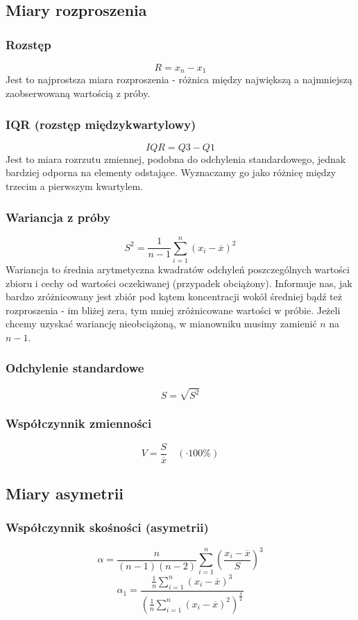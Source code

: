 \documentclass{article}
\theoremstyle{break}
\begin{document}
\subsection{Miary rozproszenia}
\subsubsection{Rozstęp}
$$R=x_n-x_1$$
Jest to najprostsza miara rozproszenia - różnica między największą a najmniejszą zaobserwowaną wartością z próby. 
\subsubsection{IQR (rozstęp międzykwartylowy)}
$$IQR=Q3-Q1$$
 Jest to miara rozrzutu zmiennej, podobna do odchylenia standardowego, jednak bardziej odporna na elementy odstające. Wyznaczamy go jako różnicę między trzecim a pierwszym kwartylem.
\subsubsection{Wariancja z próby}
$$S^2=\frac{1}{n-1}\sum\limits_{i=1}^{n}(x_i - \overline{x})^2$$
Wariancja to średnia arytmetyczna kwadratów odchyleń poszczególnych wartości zbioru i cechy od wartości oczekiwanej (przypadek obciążony).  Informuje nas, jak bardzo zróżnicowany jest zbiór pod kątem koncentracji wokół średniej bądź też rozproszenia - im bliżej zera, tym mniej zróżnicowane wartości w próbie. Jeżeli chcemy uzyskać wariancję nieobciążoną, w mianowniku musimy zamienić $n$ na $n-1$.
\subsubsection{Odchylenie standardowe}
$$S=\sqrt{S^2}$$
\subsubsection{Współczynnik zmienności}
$$V=\frac{S}{\overline{x}} \quad (\cdot 100\%)$$

\subsection{Miary asymetrii}
\subsubsection{Współczynnik skośności (asymetrii)}
$$\alpha =\frac{n}{(n-1)(n-2)}\sum\limits_{i=1}^{n}(\frac{x_i-\overline{x}}{S})^3$$
$$\alpha_1 =\frac{\frac{1}{n}\sum\limits_{i=1}^{n}(x_i-\overline{x})^3}{(\frac{1}{n}\sum\limits_{i=1}^{n}(x_i-\overline{x})^2)^{\frac{3}{2}}}$$
\end{document}
